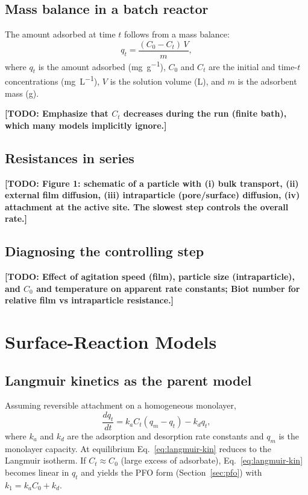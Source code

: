 \documentclass[11pt,a4paper]{article}
\newcommand{\todo}[1]{\textbf{[TODO: #1]}}
\begin{document}
\subsection{Mass balance in a batch reactor}
The amount adsorbed at time $t$ follows from a mass balance:
\begin{equation}
  q_t = \frac{(C_0 - C_t)\,V}{m},
  \label{eq:qt}
\end{equation}
where $q_t$ is the amount adsorbed (\si{\milli\gram\per\gram}), $C_0$ and
$C_t$ are the initial and time-$t$ concentrations
(\si{\milli\gram\per\liter}), $V$ is the solution volume (\si{\liter}),
and $m$ is the adsorbent mass (\si{\gram}).

\todo{Emphasize that $C_t$ decreases during the run (finite bath), which
many models implicitly ignore.}

\subsection{Resistances in series}
\todo{Figure 1: schematic of a particle with (i) bulk transport,
(ii) external film diffusion, (iii) intraparticle (pore/surface)
diffusion, (iv) attachment at the active site. The slowest step controls
the overall rate.}

\subsection{Diagnosing the controlling step}
\todo{Effect of agitation speed (film), particle size (intraparticle),
and $C_0$ and temperature on apparent rate constants; Biot number for
relative film vs intraparticle resistance.}

\section{Surface-Reaction Models}
\label{sec:reaction}

\subsection{Langmuir kinetics as the parent model}
Assuming reversible attachment on a homogeneous monolayer,
\begin{equation}
  \frac{dq_t}{dt} = k_a C_t (q_m - q_t) - k_d q_t,
  \label{eq:langmuir-kin}
\end{equation}
where $k_a$ and $k_d$ are the adsorption and desorption rate constants and
$q_m$ is the monolayer capacity. At equilibrium Eq.~\eqref{eq:langmuir-kin}
reduces to the Langmuir isotherm. If $C_t \approx C_0$ (large excess of
adsorbate), Eq.~\eqref{eq:langmuir-kin} becomes linear in $q_t$ and yields
the PFO form (Section~\ref{sec:pfo}) with $k_1 = k_a C_0 + k_d$.
\end{document}
